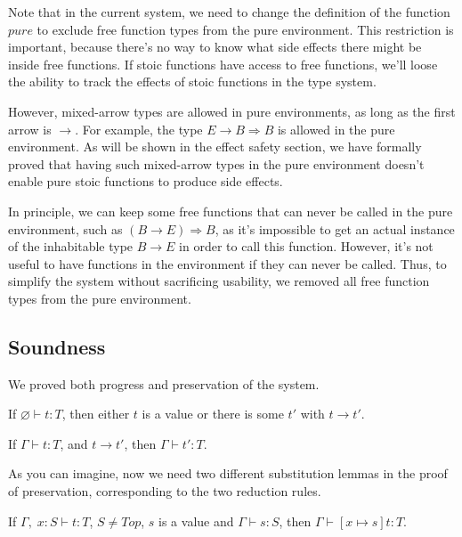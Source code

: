 Note that in the current system, we need to change the definition of
the function $pure$ to exclude free function types from the pure
environment. This restriction is important, because there's no way to
know what side effects there might be inside free functions. If stoic
functions have access to free functions, we'll loose the ability to
track the effects of stoic functions in the type system.

However, mixed-arrow types are allowed in pure environments, as long
as the first arrow is $\to$. For example, the type
$E \to B \Rightarrow B$ is allowed in the pure environment. As will be
shown in the effect safety section, we have formally proved that
having such mixed-arrow types in the pure environment doesn't enable
pure stoic functions to produce side effects.

In principle, we can keep some free functions that can never be called
in the pure environment, such as $(B \to E) \Rightarrow B$, as it's
impossible to get an actual instance of the inhabitable type $B \to E$
in order to call this function. However, it's not useful to have
functions in the environment if they can never be called. Thus, to
simplify the system without sacrificing usability, we removed all free
function types from the pure environment.

\subsection{Soundness}

We proved both progress and preservation of the system.

\begin{theorem}[Progress]
If $\varnothing \vdash t : T$, then either $t$ is a value or there is some
$t'$ with $t \longrightarrow t'$.
\end{theorem}

\begin{theorem}[Preservation]
If $\Gamma \vdash t : T$, and $t \longrightarrow t'$, then $\Gamma
\vdash t' : T$.
\end{theorem}

As you can imagine, now we need two different substitution lemmas in
the proof of preservation, corresponding to the two reduction rules.

\begin{lemma}
  If $\Gamma,\; x:S \vdash t : T$, $S \neq Top$, $s$ is a value and
  $\Gamma \vdash s : S$, then $\Gamma \vdash [x \mapsto s]t : T$.
\end{lemma}

